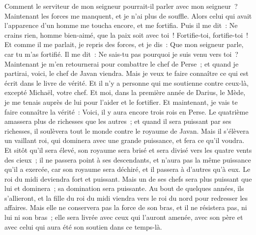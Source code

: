 \begin{multicols}{2}
Comment le serviteur de mon seigneur pourrait-il parler avec mon seigneur~? Maintenant les forces me manquent, et je n'ai plus de souffle.
Alors celui qui avait l'apparence d'un homme me toucha encore, et me fortifia.
Puis il me dit~: Ne crains rien, homme bien-aimé, que la paix soit avec toi~! Fortifie-toi, fortifie-toi~! Et comme il me parlait, je repris des forces, et je dis~: Que mon seigneur parle, car tu m'as fortifié.
Il me dit~: Ne sais-tu pas pourquoi je suis venu vers toi~? Maintenant je m'en retournerai pour combattre le chef de Perse~; et quand je partirai, voici, le chef de Javan viendra.
Mais je veux te faire connaître ce qui est écrit dans le livre de vérité. Et il n'y a personne qui me soutienne contre ceux-là, excepté Michaël, votre chef.
\VerseOne{}Et moi, dans la première année de Darius, le Mède, je me tenais auprès de lui pour l'aider et le fortifier.
Et maintenant, je vais te faire connaître la vérité~: Voici, il y aura encore trois rois en Perse. Le quatrième amassera plus de richesses que les autres~; et quand il sera puissant par ses richesses, il soulèvera tout le monde contre le royaume de Javan.
Mais il s'élèvera un vaillant roi, qui dominera avec une grande puissance, et fera ce qu'il voudra.
Et sitôt qu'il sera élevé, son royaume sera brisé et sera divisé vers les quatre vents des cieux~; il ne passera point à ses descendants, et n'aura pas la même puissance qu'il a exercée, car son royaume sera déchiré, et il passera à d'autres qu'à eux.
Le roi du midi deviendra fort et puissant. Mais un de ses chefs sera plus puissant que lui et dominera~; sa domination sera puissante.
Au bout de quelques années, ils s'allieront, et la fille du roi du midi viendra vers le roi du nord pour redresser les affaires. Mais elle ne conservera pas la force de son bras, et il ne résistera pas, ni lui ni son bras~; elle sera livrée avec ceux qui l'auront amenée, avec son père et avec celui qui aura été son soutien dans ce temps-là.

\end{multicols}
